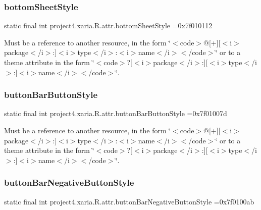 \subsubsection{\texorpdfstring{bottom\+Sheet\+Style}{bottomSheetStyle}}
{\footnotesize\ttfamily static final int project4.\+xaria.\+R.\+attr.\+bottom\+Sheet\+Style =0x7f010112\hspace{0.3cm}{\ttfamily [static]}}

Must be a reference to another resource, in the form \char`\"{}$<$code$>$@\mbox{[}+\mbox{]}\mbox{[}$<$i$>$package$<$/i$>$\+:\mbox{]}$<$i$>$type$<$/i$>$\+:$<$i$>$name$<$/i$>$$<$/code$>$\char`\"{} or to a theme attribute in the form \char`\"{}$<$code$>$?\mbox{[}$<$i$>$package$<$/i$>$\+:\mbox{]}\mbox{[}$<$i$>$type$<$/i$>$\+:\mbox{]}$<$i$>$name$<$/i$>$$<$/code$>$\char`\"{}. \mbox{\label{classproject4_1_1xaria_1_1R_1_1attr_a69da0fd347d0a739ab7d9c4b10a1c0d1}} 
\subsubsection{\texorpdfstring{button\+Bar\+Button\+Style}{buttonBarButtonStyle}}
{\footnotesize\ttfamily static final int project4.\+xaria.\+R.\+attr.\+button\+Bar\+Button\+Style =0x7f01007d\hspace{0.3cm}{\ttfamily [static]}}

Must be a reference to another resource, in the form \char`\"{}$<$code$>$@\mbox{[}+\mbox{]}\mbox{[}$<$i$>$package$<$/i$>$\+:\mbox{]}$<$i$>$type$<$/i$>$\+:$<$i$>$name$<$/i$>$$<$/code$>$\char`\"{} or to a theme attribute in the form \char`\"{}$<$code$>$?\mbox{[}$<$i$>$package$<$/i$>$\+:\mbox{]}\mbox{[}$<$i$>$type$<$/i$>$\+:\mbox{]}$<$i$>$name$<$/i$>$$<$/code$>$\char`\"{}. \mbox{\label{classproject4_1_1xaria_1_1R_1_1attr_ad57aa1bd7993affe0fbaadfb8f07748c}} 
\subsubsection{\texorpdfstring{button\+Bar\+Negative\+Button\+Style}{buttonBarNegativeButtonStyle}}
{\footnotesize\ttfamily static final int project4.\+xaria.\+R.\+attr.\+button\+Bar\+Negative\+Button\+Style =0x7f0100ab\hspace{0.3cm}{\ttfamily [static]}}

